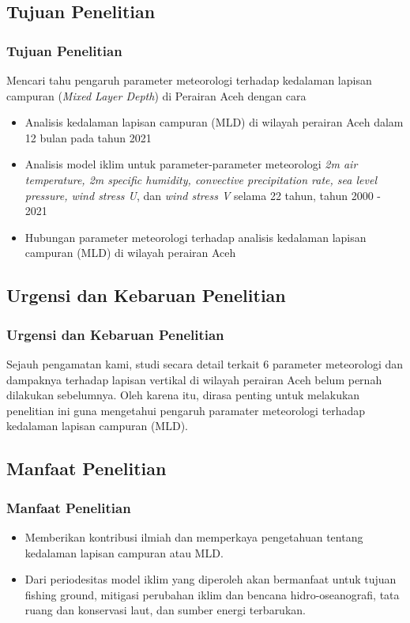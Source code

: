 \documentclass{beamer}
\begin{document}
\subsection{Tujuan Penelitian}
\begin{frame}
\frametitle{Tujuan Penelitian}
	Mencari tahu pengaruh parameter meteorologi terhadap kedalaman lapisan campuran (\textit{Mixed Layer Depth}) di Perairan Aceh dengan cara

	\begin{itemize}
		\item {\small Analisis kedalaman lapisan campuran (MLD) di wilayah perairan Aceh dalam 12 bulan pada tahun 2021} 
		\item {\small Analisis model iklim untuk parameter-parameter meteorologi \textit{2m air temperature, 2m specific humidity, convective precipitation rate, sea level pressure, wind stress U}, dan \textit{wind stress V} selama 22 tahun, tahun 2000 - 2021}
		\item {\small Hubungan parameter meteorologi terhadap analisis kedalaman lapisan campuran (MLD) di wilayah perairan Aceh}
	\end{itemize}
\end{frame}

\subsection{Urgensi dan Kebaruan Penelitian}
\begin{frame}
	\frametitle{Urgensi dan Kebaruan Penelitian}
	Sejauh pengamatan kami, studi secara detail terkait 6 parameter meteorologi dan dampaknya terhadap lapisan vertikal di wilayah perairan Aceh belum pernah dilakukan sebelumnya. Oleh karena itu, dirasa penting untuk melakukan penelitian ini guna mengetahui pengaruh paramater meteorologi terhadap kedalaman lapisan campuran (MLD).
\end{frame}

\subsection{Manfaat Penelitian}
\begin{frame}
	\frametitle{Manfaat Penelitian}
	\begin{itemize}
		\item Memberikan kontribusi ilmiah dan memperkaya pengetahuan tentang kedalaman lapisan campuran atau MLD.
		\item Dari periodesitas model iklim yang diperoleh akan bermanfaat untuk tujuan fishing ground, mitigasi perubahan iklim dan bencana hidro-oseanografi, tata ruang dan konservasi laut, dan sumber energi terbarukan.
	\end{itemize}
\end{frame}
\end{document}
